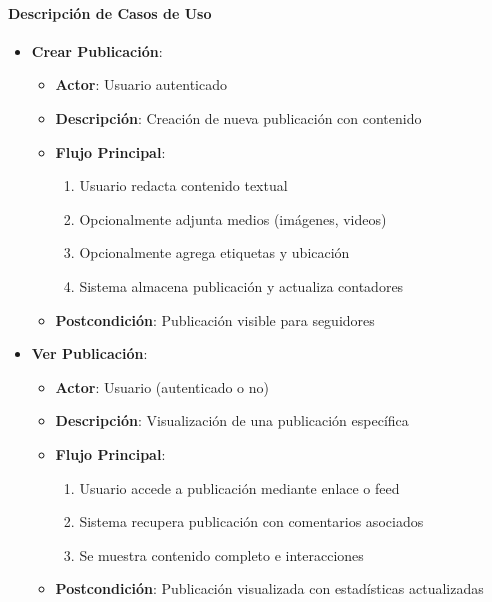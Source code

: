 \documentclass[12pt,letterpaper]{article}
\begin{document}
\paragraph{Descripción de Casos de Uso}
\begin{itemize}
    \item \textbf{Crear Publicación}:
    \begin{itemize}
        \item \textbf{Actor}: Usuario autenticado
        \item \textbf{Descripción}: Creación de nueva publicación con contenido
        \item \textbf{Flujo Principal}:
        \begin{enumerate}
            \item Usuario redacta contenido textual
            \item Opcionalmente adjunta medios (imágenes, videos)
            \item Opcionalmente agrega etiquetas y ubicación
            \item Sistema almacena publicación y actualiza contadores
        \end{enumerate}
        \item \textbf{Postcondición}: Publicación visible para seguidores
    \end{itemize}
    
    \item \textbf{Ver Publicación}:
    \begin{itemize}
        \item \textbf{Actor}: Usuario (autenticado o no)
        \item \textbf{Descripción}: Visualización de una publicación específica
        \item \textbf{Flujo Principal}:
        \begin{enumerate}
            \item Usuario accede a publicación mediante enlace o feed
            \item Sistema recupera publicación con comentarios asociados
            \item Se muestra contenido completo e interacciones
        \end{enumerate}
        \item \textbf{Postcondición}: Publicación visualizada con estadísticas actualizadas
    \end{itemize}
    

\end{itemize}
\end{document}
